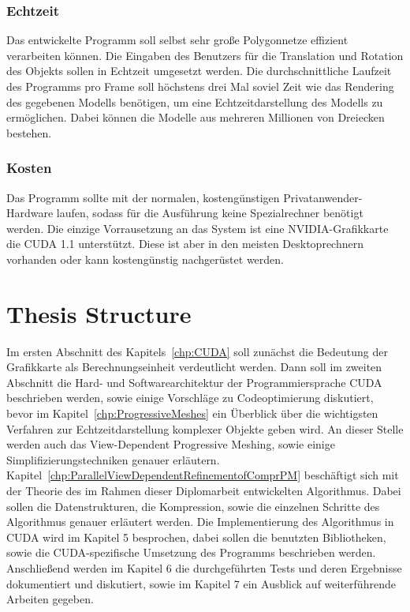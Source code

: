 \subsubsection{Echtzeit} 
Das entwickelte Programm soll selbst sehr große Polygonnetze effizient verarbeiten können. Die Eingaben des Benutzers für die Translation und Rotation des Objekts sollen in Echtzeit umgesetzt werden. Die durchschnittliche Laufzeit des Programms pro Frame soll höchstens drei Mal soviel Zeit wie das Rendering des gegebenen Modells benötigen, um eine Echtzeitdarstellung des Modells zu ermöglichen. Dabei können die Modelle aus mehreren Millionen von Dreiecken bestehen.

\subsubsection{Kosten} 
Das Programm sollte mit der normalen, kostengünstigen Privatanwender-Hardware laufen, sodass für die Ausführung keine Spezialrechner benötigt werden. Die einzige Vorrausetzung an das System ist eine NVIDIA-Grafikkarte die CUDA 1.1 unterstützt. Diese ist aber in den meisten Desktoprechnern vorhanden oder kann kostengünstig nachgerüstet werden. 

\section{Thesis Structure}
Im ersten Abschnitt des Kapitels~\ref{chp:CUDA} soll zunächst die Bedeutung der Grafikkarte als Berechnungseinheit verdeutlicht werden. Dann soll  im zweiten Abschnitt die Hard- und Softwarearchitektur der Programmiersprache \acs{CUDA} beschrieben werden, sowie einige Vorschläge zu Codeoptimierung diskutiert, bevor im Kapitel~\ref{chp:ProgressiveMeshes} ein Überblick über die wichtigsten Verfahren zur Echtzeitdarstellung komplexer Objekte geben wird. An dieser Stelle werden auch das View-Dependent Progressive Meshing, sowie einige Simplifizierungstechniken genauer erläutern.        Kapitel~\ref{chp:ParallelViewDependentRefinementofComprPM} beschäftigt sich mit der Theorie des im Rahmen dieser Diplomarbeit entwickelten Algorithmus. Dabei sollen die Datenstrukturen, die Kompression, sowie die einzelnen Schritte des Algorithmus genauer erläutert werden. Die Implementierung des Algorithmus in \acs{CUDA} wird im Kapitel 5 besprochen, dabei sollen die benutzten Bibliotheken, sowie die \acs{CUDA}-spezifische Umsetzung des Programms beschrieben werden. Anschließend werden im Kapitel 6 die durchgeführten Tests und deren Ergebnisse dokumentiert und diskutiert, sowie im Kapitel 7 ein Ausblick auf weiterführende Arbeiten gegeben. 


